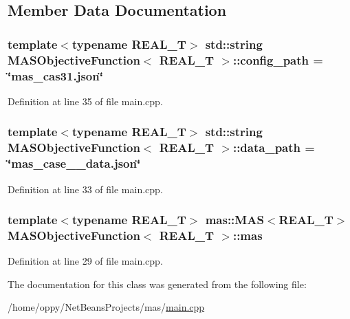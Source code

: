 \subsection{Member Data Documentation}
\hypertarget{class_m_a_s_objective_function_a2f79e227571b0ebbf941183aee8be623}{
\subsubsection[{config\-\_\-path}]{\setlength{\rightskip}{0pt plus 5cm}template$<$typename R\-E\-A\-L\-\_\-\-T$>$ std\-::string {\bf M\-A\-S\-Objective\-Function}$<$ R\-E\-A\-L\-\_\-\-T $>$\-::config\-\_\-path = \char`\"{}mas\-\_\-cas31.\-json\char`\"{}}}\label{class_m_a_s_objective_function_a2f79e227571b0ebbf941183aee8be623}


Definition at line 35 of file main.\-cpp.

\hypertarget{class_m_a_s_objective_function_a829411b4be9bcb22e10e07748ef7b4f1}{
\subsubsection[{data\-\_\-path}]{\setlength{\rightskip}{0pt plus 5cm}template$<$typename R\-E\-A\-L\-\_\-\-T$>$ std\-::string {\bf M\-A\-S\-Objective\-Function}$<$ R\-E\-A\-L\-\_\-\-T $>$\-::data\-\_\-path = \char`\"{}mas\-\_\-case\-\_\-\_\-data.\-json\char`\"{}}}\label{class_m_a_s_objective_function_a829411b4be9bcb22e10e07748ef7b4f1}


Definition at line 33 of file main.\-cpp.

\hypertarget{class_m_a_s_objective_function_acb7a8a71c46a7d51804cc8dd61bd558a}{
\subsubsection[{mas}]{\setlength{\rightskip}{0pt plus 5cm}template$<$typename R\-E\-A\-L\-\_\-\-T$>$ {\bf mas\-::\-M\-A\-S}$<$R\-E\-A\-L\-\_\-\-T$>$ {\bf M\-A\-S\-Objective\-Function}$<$ R\-E\-A\-L\-\_\-\-T $>$\-::mas}}\label{class_m_a_s_objective_function_acb7a8a71c46a7d51804cc8dd61bd558a}


Definition at line 29 of file main.\-cpp.



The documentation for this class was generated from the following file\-:\begin{DoxyCompactItemize}
\item 
/home/oppy/\-Net\-Beans\-Projects/mas/\hyperlink{main_8cpp}{main.\-cpp}\end{DoxyCompactItemize}
